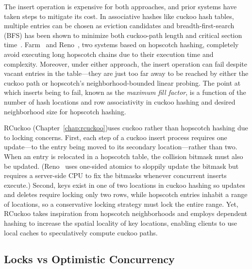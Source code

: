\documentclass[12pt]{ucsddissertation}
\begin{document}
The insert operation is expensive for both approaches, and prior
systems have taken steps to mitigate its cost.  In associative hashes
like cuckoo hash tables, multiple entries can be chosen as eviction
candidates and breadth-first-search (BFS) has been shown to minimize
both cuckoo-path length and critical section
time~\cite{memc3,cuckoo-improvements}.
Farm~\cite{farm} and Reno~\cite{reno}, two systems based on hopscotch
hashing, completely avoid executing long hopscotch chains due to their
execution time and complexity.  Moreover, under either approach, the
insert operation can fail despite vacant entries in the table---they
are just too far away to be reached by either the cuckoo path or
hopscotch's neighborhood-bounded linear probing.  The point at which
inserts being to fail, known as the \emph{maximum fill factor}, is a
function of the number of hash locations and row associativity in
cuckoo hashing and desired neighborhood size for hopscotch hashing.

RCuckoo (Chapter~\ref{chap:rcuckoo})uses cuckoo rather than hopscotch hashing due to locking
concerns.
First, each step of a cuckoo insert process requires one update---to the entry being moved to its
secondary location---rather than two.  When an entry is relocated in a hopscotch table, the
collision bitmask must also be updated.  (Reno~\cite{reno} uses one-sided atomics to sloppily update
the bitmask but requires a server-side CPU to fix the bitmasks whenever concurrent inserts execute.)
Second, keys exist in one of two locations in cuckoo hashing so updates and deletes require locking
only two rows, while hopscotch entries inhabit a range of locations, so a conservative locking
strategy must lock the entire range.  Yet, RCuckoo takes inspiration from hopscotch neighborhoods
and employs dependent hashing to increase the spatial locality of key locations, enabling clients to
use local caches to speculatively compute cuckoo paths.


\subsection{Locks vs Optimistic Concurrency}
\label{sec:lock-vs-op}
\end{document}
